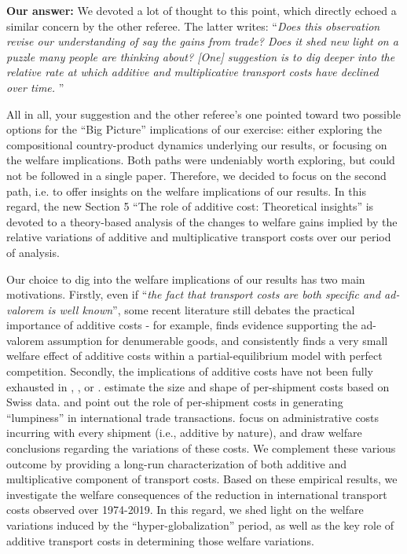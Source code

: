 \documentclass[a4paper,11pt]{article}
\begin{document}
\textbf{Our answer:} We devoted a lot of thought to this point, which directly echoed a similar concern by the other referee. The latter writes: ``\emph{Does this observation revise our understanding of say the gains from trade? Does it shed new light on a puzzle many people are thinking about? [One] suggestion is to dig deeper into the relative rate at which additive and multiplicative transport costs have declined over time.}
''

All in all, your suggestion and the other referee's one pointed toward two possible options for the ``Big Picture'' implications of our exercise: either exploring the compositional country-product dynamics underlying our results, or focusing on the welfare implications. Both paths were undeniably worth exploring, but could not be followed in a single paper. Therefore, we decided to focus on the second path, i.e. to  offer insights on the welfare implications of our results. In this regard, the new Section 5 ``The role of additive cost: Theoretical insights'' is devoted to a theory-based analysis of the changes to welfare gains implied by the relative variations of additive and multiplicative transport costs over our period of analysis.

Our choice to dig into the welfare implications of our results has two main motivations. Firstly, even if ``\emph{the fact that transport costs are both specific and ad-valorem is well known}'', some recent literature still debates the practical importance of additive costs - for example, \cite{Lashkaripour_JIE2020} finds evidence supporting the ad-valorem assumption for denumerable goods, and consistently finds a very small welfare effect of additive costs within a partial-equilibrium model with perfect competition. Secondly, the implications of additive costs have not been fully exhausted in \citet{Irrazabal_2015}, \cite{Hornok-et-al-JIE-2015,Hornok-et-al-RES-2015}, \cite{Alessandria-et-al-AER-2010} or \citet{sorensen2014}. \cite{Kropf-Saure-JIE-2016} estimate the size and shape of per-shipment costs based on Swiss data. \cite{Alessandria-et-al-AER-2010} and \cite{Hornok-et-al-RES-2015} point out the role of per-shipment costs in generating ``lumpiness'' in international trade transactions. \cite{Hornok-et-al-JIE-2015} focus on administrative costs incurring with every shipment (i.e., additive by nature), and draw welfare conclusions regarding the variations of these costs. We complement these various outcome by providing a long-run characterization of both additive and multiplicative component of transport costs. Based on these empirical results, we investigate the welfare consequences of the reduction in international transport costs observed over 1974-2019. In this regard, we shed light on the welfare variations induced by the ``hyper-globalization'' period, as well as the key role of additive transport costs in determining those welfare variations.\smallskip
\end{document}
